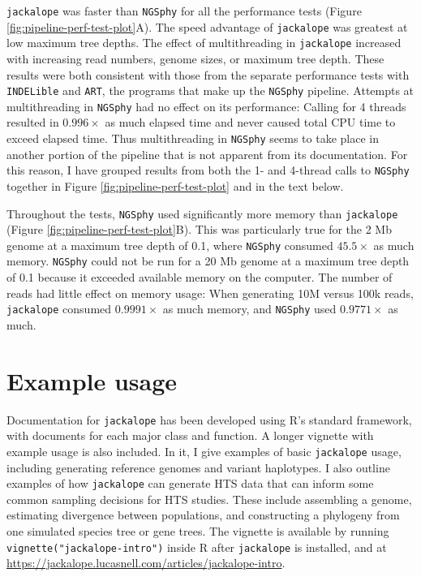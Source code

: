 \documentclass[12pt,]{article}
\begin{document}
\texttt{jackalope} was faster than \texttt{NGSphy} for all the performance tests
(Figure \ref{fig:pipeline-perf-test-plot}A).
The speed advantage of \texttt{jackalope} was greatest at low maximum tree depths.
The effect of multithreading in \texttt{jackalope} increased with increasing read numbers,
genome sizes, or maximum tree depth.
These results were both consistent with those from the separate performance tests with
\texttt{INDELible} and \texttt{ART}, the programs that make up the \texttt{NGSphy} pipeline.
Attempts at multithreading in \texttt{NGSphy} had no effect on its performance:
Calling for 4 threads resulted in \(0.996 \times\)
as much elapsed time and never caused total CPU time to exceed elapsed time.
Thus multithreading in \texttt{NGSphy} seems to take place in another portion of the pipeline
that is not apparent from its documentation.
For this reason, I have grouped results from both the 1- and 4-thread calls to \texttt{NGSphy}
together in Figure \ref{fig:pipeline-perf-test-plot} and in the text below.

Throughout the tests, \texttt{NGSphy} used significantly more memory than \texttt{jackalope}
(Figure \ref{fig:pipeline-perf-test-plot}B).
This was particularly true for the 2 Mb genome at a maximum tree depth of 0.1,
where \texttt{NGSphy} consumed
\(45.5 \times\)
as much memory.
\texttt{NGSphy} could not be run for a 20 Mb genome at a maximum tree depth of 0.1 because
it exceeded available memory on the computer.
The number of reads had little effect on memory usage: When generating 10M versus
100k reads, \texttt{jackalope} consumed \(0.9991 \times\)
as much memory, and \texttt{NGSphy} used \(0.9771 \times\)
as much.

\hypertarget{example-usage}{%
\section{Example usage}\label{example-usage}}

Documentation for \texttt{jackalope} has been developed using R's standard framework, with
documents for each major class and function.
A longer vignette with example usage is also included.
In it, I give examples of basic \texttt{jackalope} usage, including generating reference genomes
and variant haplotypes.
I also outline examples of how \texttt{jackalope} can generate HTS data that can inform
some common sampling decisions for HTS studies.
These include assembling a genome, estimating divergence between populations,
and constructing a phylogeny from one simulated species tree or gene trees.
The vignette is available
by running \texttt{vignette("jackalope-intro")} inside R after \texttt{jackalope} is installed,
and at
\url{https://jackalope.lucasnell.com/articles/jackalope-intro}.
\end{document}
